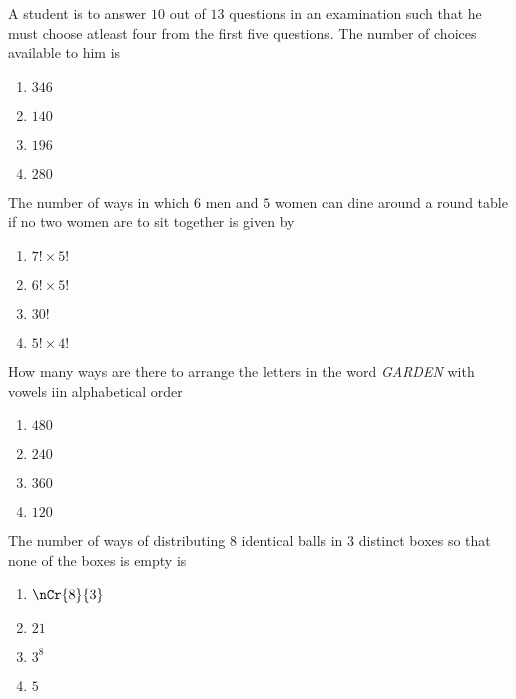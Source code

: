 \iffalse
\title{Chapter 4 Permutations and Combinations}
\author{EE24BTECH11012 - Bhavanisankar G S}
\section{mains}
\fi
	\item A student is to answer $10$ out of $13$ questions in an examination such that he must choose atleast four from the first five questions. The number of choices available to him is  \hfill {}	
       \begin{multicols}{4}		
\begin{enumerate} 
    \item  $346$
    \item  $140 $
    \item  $196$
    \item  $280$
      \end{enumerate}
      \end{multicols}
\item The number of ways in which $6$ men and $5$ women can dine around a round table if no two women are to sit together is given by \hfill {}
	\begin{multicols}{4}	
 \begin{enumerate}
 \item $7!\times5!$
 \item $6!\times 5!$
 \item $30!$
 \item $5!\times4!$
 \end{enumerate}
	\end{multicols}
\item How many ways are there to arrange the letters in the word \emph{GARDEN} with vowels iin alphabetical order \hfill {}
	\begin{multicols}{4}
		\begin{enumerate}
     \item $480$
     \item $240$
     \item $360$
     \item $120$
 \end{enumerate}
	\end{multicols}
\item The number of ways of distributing 8 identical balls in $3$ distinct boxes so that none of the boxes is empty is \hfill {}
	\begin{multicols}{4}
		\begin{enumerate}
			\item $ \nCr{8}{3}$
     \item $21$
     \item $3^8$
     \item $5$
 \end{enumerate}
	\end{multicols}
